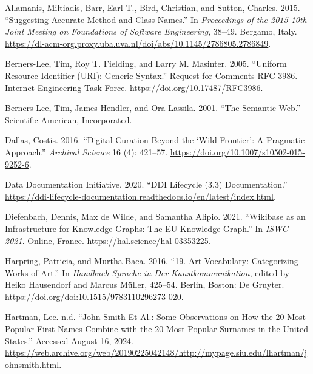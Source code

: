 \documentclass[
  letterpaper,
  DIV=11,
  numbers=noendperiod]{scrreprt}
\newlength{\cslhangindent}
\newenvironment{CSLReferences}[2] %
 {\begin{list}{}{%
  \setlength{\itemindent}{0pt}
  \setlength{\leftmargin}{0pt}
  \setlength{\parsep}{0pt}
  \ifodd #1
   \setlength{\leftmargin}{\cslhangindent}
   \setlength{\itemindent}{-1\cslhangindent}
  \fi
  \setlength{\itemsep}{#2\baselineskip}}}
 {\end{list}}
\begin{document}
\label{refs}
\begin{CSLReferences}{1}{0}
Allamanis, Miltiadis, Barr, Earl T., Bird, Christian, and Sutton,
Charles. 2015. {``Suggesting Accurate Method and Class Names.''} In
\emph{Proceedings of the 2015 10th Joint Meeting on Foundations of
Software Engineering}, 38--49. Bergamo, Italy.
\url{https://dl-acm-org.proxy.uba.uva.nl/doi/abs/10.1145/2786805.2786849}.

Berners-Lee, Tim, Roy T. Fielding, and Larry M. Masinter. 2005.
{``Uniform Resource Identifier ({URI}): Generic Syntax.''} Request for
Comments {RFC} 3986. Internet Engineering Task Force.
\url{https://doi.org/10.17487/RFC3986}.

Berners-Lee, Tim, James Hendler, and Ora Lassila. 2001. {``The Semantic
Web.''} Scientific American, Incorporated.

Dallas, Costis. 2016. {``Digital Curation Beyond the {`Wild Frontier'}:
A Pragmatic Approach.''} \emph{Archival Science} 16 (4): 421--57.
\url{https://doi.org/10.1007/s10502-015-9252-6}.

Data Documentation Initiative. 2020. {``DDI Lifecycle {(3.3)}
Documentation.''}
\url{https://ddi-lifecycle-documentation.readthedocs.io/en/latest/index.html}.

Diefenbach, Dennis, Max de Wilde, and Samantha Alipio. 2021. {``Wikibase
as an Infrastructure for Knowledge Graphs: The {EU} Knowledge Graph.''}
In \emph{{ISWC} 2021}. Online, France.
\url{https://hal.science/hal-03353225}.

Harpring, Patricia, and Murtha Baca. 2016. {``19. Art Vocabulary:
Categorizing Works of Art.''} In \emph{Handbuch Sprache in Der
Kunstkommunikation}, edited by Heiko Hausendorf and Marcus Müller,
425--54. Berlin, Boston: De Gruyter.
\url{https://doi.org/doi:10.1515/9783110296273-020}.

Hartman, Lee. n.d. {``John Smith Et Al.: Some Observations on How the 20
Most Popular First Names Combine with the 20 Most Popular Surnames in
the United States.''} Accessed August 16, 2024.
\url{https://web.archive.org/web/20190225042148/http://mypage.siu.edu/lhartman/johnsmith.html}.


\end{CSLReferences}
\end{document}
